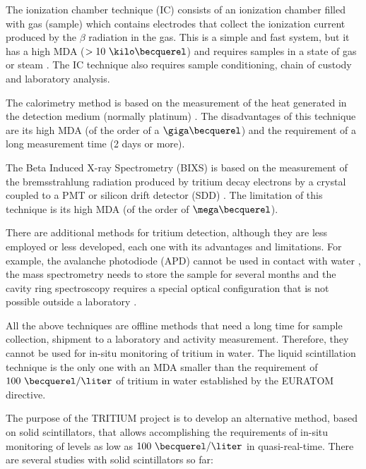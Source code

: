 The ionization chamber technique (IC) consists of an ionization chamber filled with gas (sample) which contains electrodes that collect the ionization current produced by the $\beta$ radiation in the gas. This is a simple and fast system, but it has a high MDA ($> 10~\kilo\becquerel$) and requires samples in a state of gas or steam \cite{IonizationChamber1, IonizationChamber2}. The IC technique also requires sample conditioning, chain of custody and laboratory analysis. 

The calorimetry method is based on the measurement of the heat generated in the detection medium (normally platinum) \cite{Calorimeter1, Calorimeter2}. The disadvantages of this technique are its high MDA (of the order of a $\giga\becquerel$) and the requirement of a long measurement time (2 days or more).

The Beta Induced X-ray Spectrometry (BIXS) is based on the measurement of the bremsstrahlung radiation produced by tritium decay electrons by a  crystal coupled to a PMT  \cite{XRays1, XRays2} or silicon drift detector (SDD) \cite{Bremstrahlung}. The limitation of this technique is its high MDA (of the order of $\mega\becquerel$).

There are additional methods for tritium detection, although they are less employed or less developed, each one with its advantages and limitations. For example, the avalanche photodiode (APD) cannot be used in contact with water \cite{APD},  the mass spectrometry needs to store the sample for several months \cite{Spectrometry} and the cavity ring spectroscopy requires a special optical configuration that is not possible outside a laboratory \cite{Ring}.

All the above techniques are offline methods that need a long time for sample collection, shipment to a laboratory and activity measurement. Therefore, they cannot be used for in-situ monitoring of tritium in water. The liquid scintillation technique is the only one with an MDA smaller than the requirement of $100~\becquerel/\liter$ of tritium in water established by the EURATOM directive. 

The purpose of the TRITIUM project is to develop an alternative method, based on solid scintillators, that allows accomplishing the requirements of in-situ monitoring of levels as low as $100~\becquerel/\liter$ in quasi-real-time. There are several studies with solid scintillators so far:

